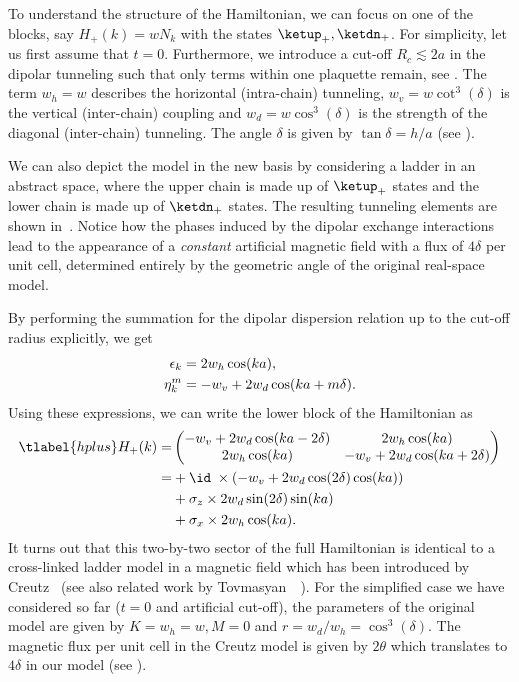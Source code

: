 To understand the structure of the Hamiltonian, we can focus on one of the blocks, say $H_+(k) = w N_k$ with the states $\ketup_+, \ketdn_+$.
For simplicity, let us first assume that $t=0$.
Furthermore, we introduce a cut-off $R_c \lesssim 2a$ in the dipolar tunneling such that only terms within one plaquette remain, see .
The term $w_h = w$ describes the horizontal (intra-chain) tunneling, $w_v = w \cot^3(\delta)$ is the vertical (inter-chain) coupling and $w_d = w \cos^3(\delta)$ is the strength of the diagonal (inter-chain) tunneling.
The angle $\delta$ is given by $\tan \delta = h/a$ (see ).

We can also depict the model in the new basis by considering a ladder in an abstract space, where the upper chain is made up of $\ketup_+$ states and the lower chain is made up of $\ketdn_+$ states.
The resulting tunneling elements are shown in~.
Notice how the phases induced by the dipolar exchange interactions lead to the appearance of a \emph{constant} artificial magnetic field with a flux of $4\delta$ per unit cell, determined entirely by the geometric angle of the original real-space model.

By performing the summation for the dipolar dispersion relation up to the cut-off radius explicitly, we get
\begin{align}
    \operatorname{\epsilon}_k &= 2 w_h \cos(ka), \\
    \eta_k^m &= -w_v + 2 w_d \cos(ka + m\delta).
\end{align}
Using these expressions, we can write the lower block of the Hamiltonian as
\begin{align} \tlabel{hplus}
    H_+(k) = &\begin{pmatrix}
        -w_v + 2w_d \cos(ka-2\delta) & 2w_h \cos(ka) \\
        2w_h\cos(ka) & -w_v + 2w_d \cos(ka+2\delta)
    \end{pmatrix} \\
    = &+\id \; \times (-w_v + 2w_d \cos(2\delta) \cos(ka)) \\
    &+\sigma_z \times 2w_d \sin(2\delta) \sin(ka) \\
    &+\sigma_x \times 2w_h \cos(ka).
\end{align}
It turns out that this two-by-two sector of the full Hamiltonian is identical to a cross-linked ladder model in a magnetic field which has been introduced by Creutz~\cite{Creutz1999} (see also related work by Tovmasyan~\etal~\cite{Tovmasyan2013a}).
For the simplified case we have considered so far ($t=0$ and artificial cut-off), the parameters of the original model are given by $K=w_h=w, M=0$ and $r=w_d/w_h=\cos^3(\delta)$.
The magnetic flux per unit cell in the Creutz model is given by $2\theta$ which translates to $4\delta$ in our model (see ).

